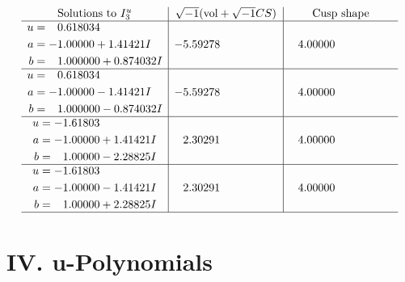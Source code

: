 \documentclass[1p]{elsarticle_modified}
\theoremstyle{definition}
\newcommand{\I}{\sqrt{-1}}
\begin{document}
$$\begin{array}{c|c|c}  
\text{Solutions to }I^u_{3}& \I (\text{vol} + \sqrt{-1}CS) & \text{Cusp shape}\\
 \hline 
\begin{aligned}
u &= \phantom{-}0.618034\phantom{ +0.000000I} \\
a &= -1.00000 + 1.41421 I \\
b &= \phantom{-}1.000000 + 0.874032 I\end{aligned}
 & -5.59278\phantom{ +0.000000I} & \phantom{-}4.00000\phantom{ +0.000000I} \\ \hline\begin{aligned}
u &= \phantom{-}0.618034\phantom{ +0.000000I} \\
a &= -1.00000 - 1.41421 I \\
b &= \phantom{-}1.000000 - 0.874032 I\end{aligned}
 & -5.59278\phantom{ +0.000000I} & \phantom{-}4.00000\phantom{ +0.000000I} \\ \hline\begin{aligned}
u &= -1.61803\phantom{ +0.000000I} \\
a &= -1.00000 + 1.41421 I \\
b &= \phantom{-}1.00000 - 2.28825 I\end{aligned}
 & \phantom{-}2.30291\phantom{ +0.000000I} & \phantom{-}4.00000\phantom{ +0.000000I} \\ \hline\begin{aligned}
u &= -1.61803\phantom{ +0.000000I} \\
a &= -1.00000 - 1.41421 I \\
b &= \phantom{-}1.00000 + 2.28825 I\end{aligned}
 & \phantom{-}2.30291\phantom{ +0.000000I} & \phantom{-}4.00000\phantom{ +0.000000I}\\
 \hline 
 \end{array}$$\newpage
\newpage\renewcommand{\arraystretch}{1}
\centering \section*{ IV. u-Polynomials}
\end{document}
